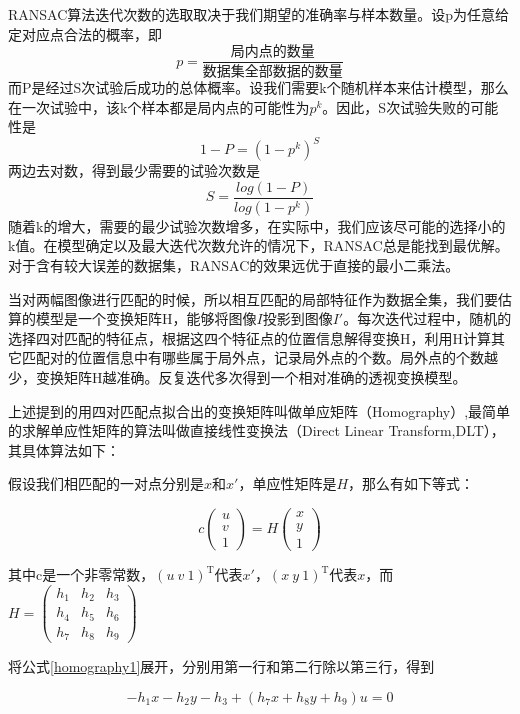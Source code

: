 RANSAC算法迭代次数的选取取决于我们期望的准确率与样本数量。设p为任意给定对应点合法的概率，即
\[p = \frac{\text{局内点的数量}}{\text{数据集全部数据的数量}}\]
而P是经过S次试验后成功的总体概率。设我们需要k个随机样本来估计模型，那么在一次试验中，该k个样本都是局内点的可能性为\(p^k\)。因此，S次试验失败的可能性是
\[1 - P = (1 - p^k)^S\]
两边去对数，得到最少需要的试验次数是
\[S = \frac{log(1-P)}{log(1-p^k)}\]
随着k的增大，需要的最少试验次数增多，在实际中，我们应该尽可能的选择小的k值。在模型确定以及最大迭代次数允许的情况下，RANSAC总是能找到最优解。对于含有较大误差的数据集，RANSAC的效果远优于直接的最小二乘法。

当对两幅图像进行匹配的时候，所以相互匹配的局部特征作为数据全集，我们要估算的模型是一个变换矩阵H，能够将图像\(I\)投影到图像\(I'\)。每次迭代过程中，随机的选择四对匹配的特征点，根据这四个特征点的位置信息解得变换H，利用H计算其它匹配对的位置信息中有哪些属于局外点，记录局外点的个数。局外点的个数越少，变换矩阵H越准确。反复迭代多次得到一个相对准确的透视变换模型。

上述提到的用四对匹配点拟合出的变换矩阵叫做单应矩阵（Homography）,最简单的求解单应性矩阵的算法叫做直接线性变换法（Direct Linear Transform,DLT）\cite{Dubrofsky:2009tz}，其具体算法如下：

假设我们相匹配的一对点分别是\(x\)和\(x'\)，单应性矩阵是\(H\)，那么有如下等式：

\begin{equation}
\label{homography1}
	c
	\begin{pmatrix}
	u \\
	v \\
	1
	\end{pmatrix}
	= H
	\begin{pmatrix}
	x \\
	y \\
	1
	\end{pmatrix}
\end{equation}


其中c是一个非零常数，\((u\ v\ 1)^\mathrm{T}\)代表\(x'\)，\((x \ y \ 1)^\mathrm{T}\)代表\(x\)，而
\(
H = 
\begin{pmatrix}
h_1 & h_2 & h_3 \\
h_4 & h_5 & h_6 \\
h_7 & h_8 & h_9
\end{pmatrix}
\)

将公式\eqref{homography1}展开，分别用第一行和第二行除以第三行，得到

\begin{equation}
\label{homography2}
-h_1x - h_2y - h_3 + (h_7x+h_8y+h_9)u = 0
\end{equation}

